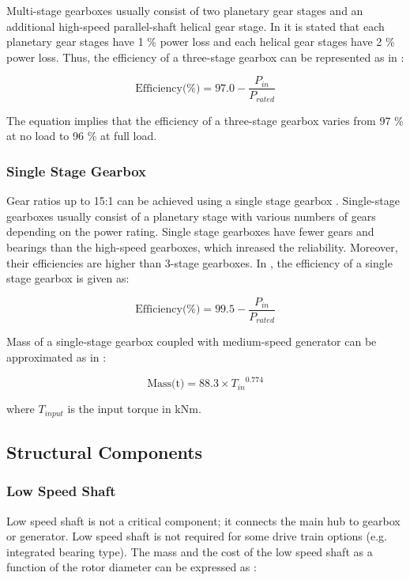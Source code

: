 \documentclass{article}
\begin{document}
Multi-stage gearboxes usually consist of two planetary gear stages and an additional high-speed parallel-shaft helical gear stage. In \cite{Hau2005a} it is stated that each planetary gear stages have 1 \% power loss and each helical gear stages have 2 \% power loss. Thus, the efficiency of a three-stage gearbox can be represented as in \cite{Zhang2011a}:

\begin{equation}
  \text{Efficiency(\%)} = 97.0 - \dfrac{P_{in}}{P_{rated}}
\end{equation}

The equation implies that the efficiency of a three-stage gearbox varies from 97 \% at no load to 96 \% at full load.


\subsubsection{Single Stage Gearbox}

Gear ratios up to 15:1 can be achieved using a single stage gearbox \cite{Cotrell2002}. Single-stage gearboxes usually consist of a planetary stage with various numbers of gears depending on the power rating. Single stage gearboxes have fewer gears and bearings than the high-speed gearboxes, which inreased the reliability. Moreover, their efficiencies are higher than 3-stage gearboxes. In \cite{Matveev2011}, the efficiency of a single stage gearbox is given as:

\begin{equation}
  \text{Efficiency(\%)} = 99.5 - \dfrac{P_{in}}{P_{rated}}
\end{equation}

Mass of a single-stage gearbox coupled with medium-speed generator can be approximated as in \cite{Fingersh2006}:

\begin{equation}
	\text{Mass(t)} = 88.3 \times {T_{in}}^{0.774}
\end{equation}

where $T_{input}$ is the input torque in kNm.


\subsection{Structural Components}

\subsubsection{Low Speed Shaft}
Low speed shaft is not a critical component; it connects the main hub to gearbox or generator. Low speed shaft is not required for some drive train options (e.g. integrated bearing type). The mass and the cost of the low speed shaft as a function of the rotor diameter can be expressed as \cite{Fingersh2006}:
\end{document}
